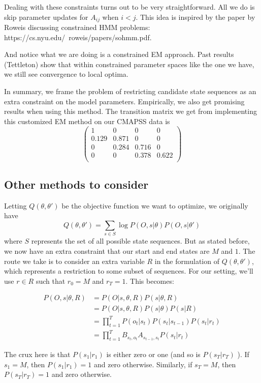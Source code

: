 \documentclass[english]{article}
\numberwithin{equation}{section}
\begin{document}
	Dealing with these constraints turns out to be very straightforward. All we do is skip parameter updates for $A_{ij}$ when $i<j$. This idea is inspired by the paper by Roweis discussing constrained HMM problems: https://cs.nyu.edu/~roweis/papers/sohmm.pdf.
	
	And notice what we are doing is a constrained EM approach. Past results (Tettleton) show that within constrained parameter spaces like the one we have, we still see convergence to local optima.
	
	In summary, we frame the problem of restricting candidate state sequences as an extra constraint on the model parameters. Empirically, we also get promising results when using this method. The transition matrix we get from implementing this customized EM method on our CMAPSS data is 
	$$\left(
	\begin{array}{cccc}
		1 & 0 & 0 & 0 \\
		0.129 & 0.871 & 0 & 0 \\
		0 & 0.284 & 0.716 & 0 \\
		0 & 0 & 0.378 & 0.622 \\
	\end{array}
	\right)$$
	\subsection*{Other methods to consider}
	Letting $Q(\theta,\theta')$ be the objective function we want to optimize, we originally have $$Q(\theta,\theta')=\sum_{s\in S} \log P(O,s|\theta)P(O,s|\theta')$$ where $S$ represents the set of all possible state sequences. But as stated before, we now have an extra constraint that our start and end states are $M$ and $1$. The route we take is to consider an extra variable $R$ in the formulation of $Q(\theta,\theta')$, which represents a restriction to some subset of sequences. For our setting, we'll use $r\in R$ such that $r_0=M$ and $r_T=1$. This becomes:
	
	\begin{align*}
	P(O,s|\theta,R) &= P(O|s,\theta,R)P(s|\theta,R) \\
	&= P(O|s,\theta,R)P(s|\theta)P(s|R) \\
	&= \prod_{t=1}^T P(o_t|s_t)P(s_t|s_{t-1})P(s_t|r_t) \\
	&= \prod_{t=1}^T B_{s_t,o_t} A_{s_{t-1},s_t} P(s_t|r_t)
	\end{align*}
	
	The crux here is that $P(s_1|r_1)$ is either zero or one (and so is  $P(s_T|r_T)$ ). If $s_1=M$, then $P(s_1|r_1)=1$ and zero otherwise. Similarly, if $s_T=M$, then $P(s_T|r_T)=1$ and zero otherwise.
	
\end{document}
